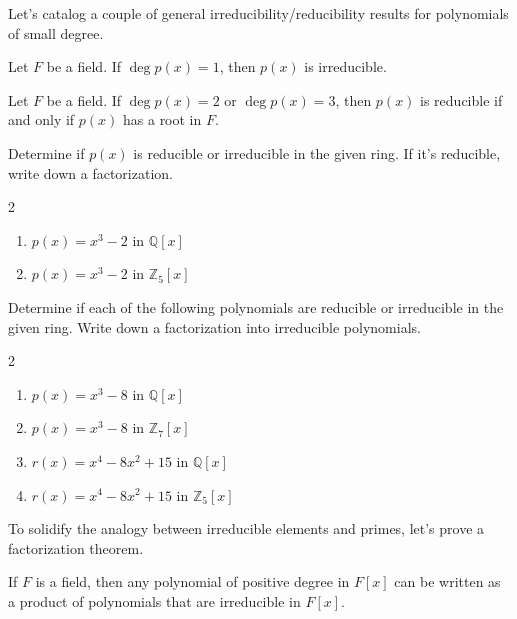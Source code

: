 Let's catalog a couple of general irreducibility/reducibility results for polynomials of small degree.

\begin{theorem}
Let $F$ be a field. If $\deg p(x) = 1$, then $p(x)$ is irreducible.
\end{theorem}

\begin{theorem}\label{thm.ReducibilityTestDegree2or3}
Let $F$ be a field. If $\deg p(x) =2$ or $\deg p(x) =3$, then $p(x)$ is reducible if and only if $p(x)$ has a root in $F$.
\end{theorem}

\begin{problem}
Determine if $p(x)$ is reducible or irreducible in the given ring. If it's reducible, write down a factorization.
\begin{multicols}{2}
\begin{enumerate}
\item $p(x) = x^3-2$ in $\mathbb{Q}[x]$
\item $p(x) = x^3-2$ in $\mathbb{Z}_5[x]$
\end{enumerate}
\end{multicols}
\end{problem}

\begin{problem}
Determine if each of the following polynomials are reducible or irreducible in the given ring. Write down a factorization into irreducible polynomials.
\begin{multicols}{2}
\begin{enumerate}
\item $p(x) = x^3-8$ in $\mathbb{Q}[x]$
\item $p(x) = x^3-8$ in $\mathbb{Z}_7[x]$
\item $r(x) = x^4-8x^2+15$ in $\mathbb{Q}[x]$
\item $r(x) = x^4-8x^2+15$ in $\mathbb{Z}_5[x]$
\end{enumerate}
\end{multicols}
\end{problem}

To solidify the analogy between irreducible elements and primes, let's prove a factorization theorem.

\begin{theorem}\label{thm.FactorIrreducibles}
If $F$ is a field, then any polynomial of positive degree in $F[x]$ can be written as a product of polynomials that are irreducible in $F[x]$.
\end{theorem}

